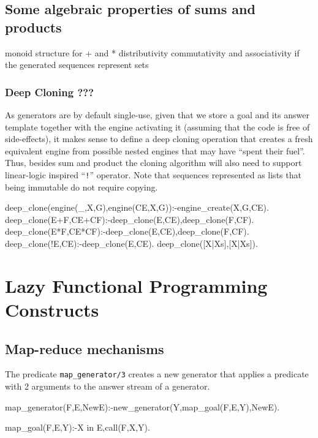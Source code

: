 \documentclass{new_tlp}
\begin{document}
\EX
\subsection{Some algebraic properties of sums and products}

\BI
\I monoid structure for + and *
\I distributivity
\I commutativity and associativity if the generated sequences represent sets
\EI

\begin{code}
\end{code}

\subsubsection{Deep Cloning ???}

As generators are by default single-use, given that we store a goal and its answer template together with the engine activating it (assuming that the code is free of side-effects), it makes sense to define a deep cloning operation that creates a fresh equivalent engine from possible nested engines that may have ``spent their fuel''.
Thus, besides  sum and product  the cloning algorithm will also need to support
linear-logic inspired ``{\tt !}'' operator. Note that sequences represented as lists that being immutable do not require copying.
\begin{code}

deep_clone(engine(_,X,G),engine(CE,X,G)):-engine_create(X,G,CE).
deep_clone(E+F,CE+CF):-deep_clone(E,CE),deep_clone(F,CF).
deep_clone(E*F,CE*CF):-deep_clone(E,CE),deep_clone(F,CF).
deep_clone(!E,CE):-deep_clone(E,CE).
deep_clone([X|Xs],[X|Xs]).
\end{code}


\section{Lazy Functional Programming Constructs}

\subsection{Map-reduce mechanisms}

The predicate {\tt map\_generator/3} creates a new generator that
applies a predicate with 2 arguments to the answer stream  of a generator.
\begin{code}
map_generator(F,E,NewE):-new_generator(Y,map_goal(F,E,Y),NewE).

map_goal(F,E,Y):-X in E,call(F,X,Y).
\end{code}
\end{document}
